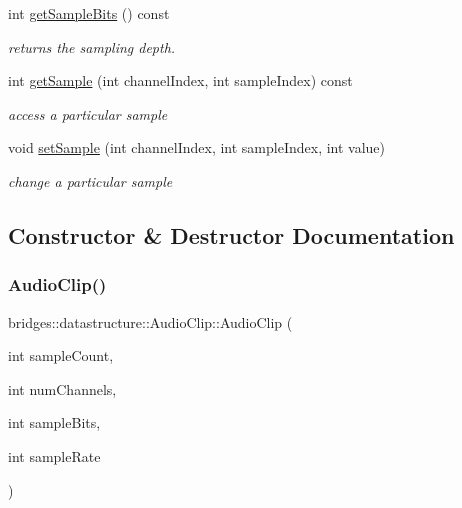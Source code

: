 \begin{DoxyCompactItemize}
int \hyperlink{classbridges_1_1datastructure_1_1_audio_clip_aca7c5460d005d62a7a0d2eae595e63d3}{get\+Sample\+Bits} () const
\begin{DoxyCompactList}\small\item\em returns the sampling depth. \end{DoxyCompactList}\item 
int \hyperlink{classbridges_1_1datastructure_1_1_audio_clip_a24bd273de32369cb9d979e7250759717}{get\+Sample} (int channel\+Index, int sample\+Index) const
\begin{DoxyCompactList}\small\item\em access a particular sample \end{DoxyCompactList}\item 
void \hyperlink{classbridges_1_1datastructure_1_1_audio_clip_aa7617402fd316152dd2585a5dbe33ded}{set\+Sample} (int channel\+Index, int sample\+Index, int value)
\begin{DoxyCompactList}\small\item\em change a particular sample \end{DoxyCompactList}\end{DoxyCompactItemize}


\subsection{Constructor \& Destructor Documentation}
\mbox{\label{classbridges_1_1datastructure_1_1_audio_clip_aa4db655f2e904a30742d45408ff6543c}} 
\subsubsection{\texorpdfstring{Audio\+Clip()}{AudioClip()}\hspace{0.1cm}{\footnotesize\ttfamily [1/2]}}
{\footnotesize\ttfamily bridges\+::datastructure\+::\+Audio\+Clip\+::\+Audio\+Clip (\begin{DoxyParamCaption}\item[{int}]{sample\+Count,  }\item[{int}]{num\+Channels,  }\item[{int}]{sample\+Bits,  }\item[{int}]{sample\+Rate }\end{DoxyParamCaption})\hspace{0.3cm}{\ttfamily [inline]}}



